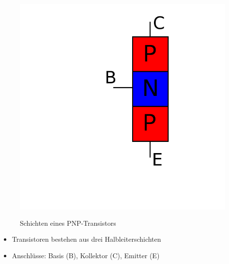 \begin{frame}
\begin{minipage}{0.4\textwidth}
\begin{figure}
      \includegraphics[width=\textwidth,height=.4\textheight,keepaspectratio]{e13/PNP_hlb.png}\\
      \caption{Schichten eines \hbox{PNP-Transistors}}
    \end{figure}
\end{minipage}
\vspace{0.5cm}
\begin{center}
\begin{itemize}
	\item Transistoren bestehen aus drei Halbleiterschichten
	\item Anschlüsse: Basis (B), Kollektor (C), Emitter (E)
\end{itemize}

\end{center}
\end{frame}

